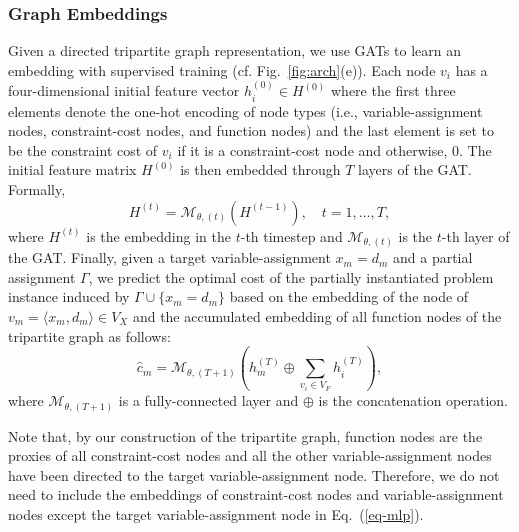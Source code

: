 \documentclass[letterpaper]{article} %
\begin{document}
\subsubsection{Graph Embeddings}
Given a directed tripartite graph representation, we use GATs to learn an embedding with supervised training (cf. Fig.~\ref{fig:arch}(e)). Each node $v_i$ has a four-dimensional initial feature vector $h^{(0)}_i\in H^{(0)}$ where the first three elements denote the one-hot encoding of node types (i.e., variable-assignment nodes, constraint-cost nodes, and function nodes) and the last element is set to be the constraint cost of $v_i$ if it is a constraint-cost node and otherwise, $0$. The initial feature matrix $H^{(0)}$ is then embedded through $T$ layers of the GAT. Formally, 
\begin{equation}
    H^{(t)} = \mathcal{M}_{\theta,(t)}(H^{(t-1)}),\quad t=1,\dots,T,\label{eq-embed}
\end{equation}
where $H^{(t)}$ is the embedding in the $t$-th timestep and $\mathcal{M}_{\theta,(t)}$ is the $t$-th layer of the GAT. Finally, given a target variable-assignment $x_m=d_m$ and a partial assignment $\Gamma$, we predict the optimal cost of the partially instantiated problem instance induced by $\Gamma\cup\{ x_m=d_m\}$ based on the embedding of the node of $v_m=\langle x_m, d_m\rangle\in V_X$ and the accumulated embedding of all function nodes of the tripartite graph as follows:
\begin{equation}
    \hat{c}_m=\mathcal{M}_{\theta, (T+1)}(h_m^{(T)}\oplus \sum_{v_i\in V_F}h_i^{(T)}), \label{eq-mlp}
\end{equation}
where $\mathcal{M}_{\theta, (T+1)}$ is a fully-connected layer and $\oplus$ is the concatenation operation.

Note that, by our construction of the tripartite graph, function nodes are the proxies of all constraint-cost nodes and all the other variable-assignment nodes have been directed to the target variable-assignment node. Therefore, we do not need to include the embeddings of constraint-cost nodes and variable-assignment nodes except the target variable-assignment node in Eq.~(\ref{eq-mlp}).
\end{document}
